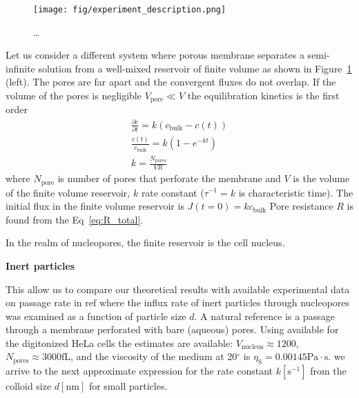 \documentclass[10pt, a4paper]{article}
\begin{document}
\begin{multicols}{2}

\begin{figure}[H]
    \centering
    \texttt{[image: fig/experiment\_description.png]}
    \caption{\dots}
    \label{fig:experiments_overview}
\end{figure}

Let us consider a different system where porous membrane separates a semi-infinite solution from a  well-mixed reservoir of finite volume as shown in Figure~\ref{fig:experiments_overview} (left).
The pores are far apart and  the convergent fluxes do not overlap.
If the volume of the pores is negligible $V_{\text{pore}} \ll V$ the equilibration kinetics is the first order
\begin{eqnarray}
    \frac{\partial c}{\partial t} = k (c_{\text{bulk}} - c(t))\\
    \frac{c(t)}{c_{\text{bulk}}} = k (1 - e^{-kt}) \\
    k = \frac{N_{\text{pores}}}{V R}
    \label{eq:rate_constant}
\end{eqnarray}
where $N_{\text{pore}}$ is number of pores that perforate the membrane and $V$ is the volume of the finite volume reservoir, $k$ rate constant ($\tau^{-1} = k$ is characteristic time).
The initial flux in the finite volume reservoir is $J(t=0) = k c_{\text{bulk}}$
Pore resistance $R$ is found from the Eq~\ref{eq:R_total}.


In the realm of nucleopores, the finite reservoir is the cell nucleus.

\textbf{Inert particles}

This allow us to compare our theoretical results with available experimental data on passage rate in ref \cite{Ribbeck2001} where the influx rate of inert particles through nucleopores was examined as a function of particle size $d$.
A natural reference is a passage through a membrane perforated with bare (aqueous) pores.
Using available for the digitonized HeLa cells the estimates are available:
$V_{\text{nucleus}} \approx 1200$,
$N_{\text{pores}} \approx 3000 \text{fL}$,
and the viscosity of the medium at 20$^\circ$ is $\eta_{\text{S}} = 0.00145 \text{Pa}\cdot \text{s}$. \cite{Mohr2009, Ribbeck2001} we arrive to the next approximate expression for the rate constant $k[\text{s}^{-1}]$ from the colloid size $d[\text{nm}]$ for small particles.


\end{multicols}
\end{document}
